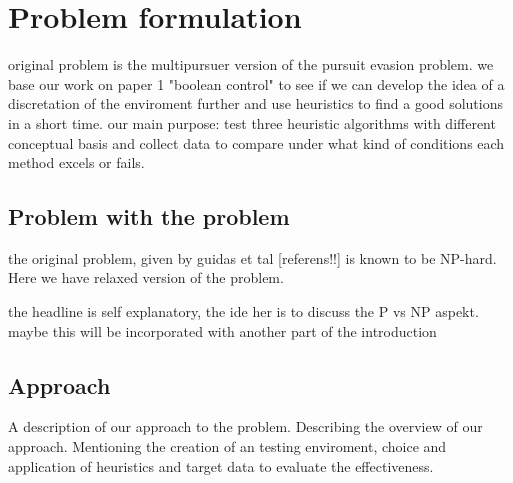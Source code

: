 \chapter{Problem formulation}
original problem is the multipursuer version of the pursuit evasion problem.
we base our work on paper 1 "boolean control" to see if we can develop the idea of a discretation of the enviroment further and use heuristics to find a good solutions in a short time.
our main purpose: test three heuristic algorithms with different conceptual basis and collect data to compare under what kind of conditions each method excels or fails.


\section{Problem with the problem}
the original problem, given by guidas et tal [referens!!] is known to be NP-hard. Here we have relaxed version of the problem.

the headline is self explanatory, the ide her is to discuss the P vs NP aspekt.
maybe this will be incorporated with another part of the introduction


\section{Approach}
A description of our approach to the problem. Describing the overview
of our approach. Mentioning the creation of an testing enviroment,
choice and application of heuristics and target data to evaluate the effectiveness.

